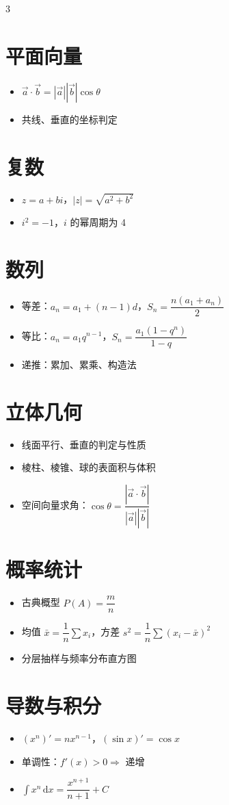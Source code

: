 \documentclass[8pt]{extarticle}
\begin{document}
\begin{multicols}{3}
\section{平面向量}
\begin{itemize}
\item $\vec a\cdot\vec b=|\vec a||\vec b|\cos\theta$
\item 共线、垂直的坐标判定
\end{itemize}
\section{复数}
\begin{itemize}
\item $z=a+bi$，$|z|=\sqrt{a^2+b^2}$
\item $i^2=-1$，$i$ 的幂周期为 4
\end{itemize}
\section{数列}
\begin{itemize}
\item 等差：$a_n=a_1+(n-1)d$，$S_n=\dfrac{n(a_1+a_n)}{2}$
\item 等比：$a_n=a_1q^{n-1}$，$S_n=\dfrac{a_1(1-q^n)}{1-q}$
\item 递推：累加、累乘、构造法
\end{itemize}
\section{立体几何}
\begin{itemize}
\item 线面平行、垂直的判定与性质
\item 棱柱、棱锥、球的表面积与体积
\item 空间向量求角：$\cos\theta=\dfrac{|\vec a\cdot\vec b|}{|\vec a||\vec b|}$
\end{itemize}
\section{概率统计}
\begin{itemize}
\item 古典概型 $P(A)=\dfrac{m}{n}$
\item 均值 $\bar x=\dfrac1n\sum x_i$，方差 $s^2=\dfrac1n\sum(x_i-\bar x)^2$
\item 分层抽样与频率分布直方图
\end{itemize}
\section{导数与积分}
\begin{itemize}
\item $(x^n)'=nx^{n-1}$，$(\sin x)'=\cos x$
\item 单调性：$f'(x)>0\Rightarrow$ 递增
\item $\displaystyle\int x^n\,\mathrm{d}x=\dfrac{x^{n+1}}{n+1}+C$
\end{itemize}
\end{multicols}
\end{document}
